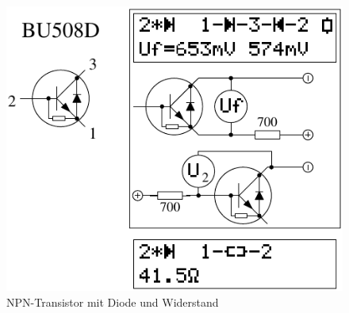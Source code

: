 \begin{figure}[H]
\centering
\includegraphics[]{../FIG/BJT_BU508D.pdf}
\caption{NPN-Transistor mit Diode und Widerstand}
\label{fig:BJT-NPN-Di-R}
\end{figure}

